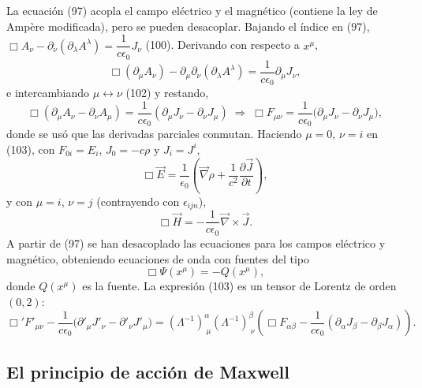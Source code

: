La ecuación (97) acopla el campo eléctrico y el magnético (contiene la
ley de Ampère modificada), pero se pueden desacoplar. Bajando el índice
en (97), $\Box A_\nu-\partial_\nu(\partial_\lambda A^\lambda)=\dfrac{1}
{c\epsilon_0}J_\nu$ (100). Derivando con respecto a $x^\mu$,
\[
\Box(\partial_\mu A_\nu)-\partial_\mu\partial_\nu(\partial_\lambda
A^\lambda)=\frac{1}{c\epsilon_0}\partial_\mu J_\nu, \tag{101}
\]
e intercambiando $\mu\leftrightarrow\nu$ (102) y restando,
\[
\Box(\partial_\mu A_\nu-\partial_\nu A_\mu)=\frac{1}{c\epsilon_0}
(\partial_\mu J_\nu-\partial_\nu J_\mu)\;\Longrightarrow\;\Box F_{\mu\nu}
=\frac{1}{c\epsilon_0}\big(\partial_\mu J_\nu-\partial_\nu J_\mu\big),
\tag{103}
\]
donde se usó que las derivadas parciales conmutan. Haciendo $\mu=0$,
$\nu=i$ en (103), con $F_{0i}=E_i$, $J_0=-c\rho$ y $J_i=J^i$,
\[
\Box\vec E=\frac{1}{\epsilon_0}\left(\vec\nabla\rho+\frac{1}{c^2}
\frac{\partial\vec J}{\partial t}\right), \tag{104}
\]
y con $\mu=i$, $\nu=j$ (contrayendo con $\epsilon_{ijn}$),
\[
\Box\vec H=-\frac{1}{c\epsilon_0}\vec\nabla\times\vec J . \tag{105}
\]
A partir de (97) se han desacoplado las ecuaciones para los campos
eléctrico y magnético, obteniendo ecuaciones de onda con fuentes del
tipo
\[
\Box\Psi(x^\mu)=-Q(x^\mu), \tag{106}
\]
donde $Q(x^\mu)$ es la fuente. La expresión (103) es un tensor de Lorentz
de orden $(0,2)$:
\[
\Box'F'_{\mu\nu}-\frac{1}{c\epsilon_0}\big(\partial'_\mu J'_\nu-
\partial'_\nu J'_\mu\big)=(\Lambda^{-1})^\alpha_{\ \mu}(\Lambda^{-1})^\beta_
{\ \nu}\left(\Box F_{\alpha\beta}-\frac{1}{c\epsilon_0}(\partial_\alpha
J_\beta-\partial_\beta J_\alpha)\right). \tag{107}
\]

\subsection{El principio de acción de Maxwell}

